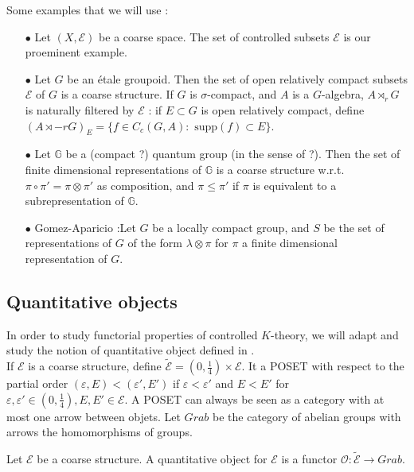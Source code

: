 \begin{Expl} Some examples that we will use :\\
\begin{itemize}
\item[$\bullet$] Let $(X,\mathcal E)$ be a coarse space. The set of controlled subsets $\mathcal E$ is our proeminent example.
\item[$\bullet$] Let $G$ be an étale groupoid. Then the set of open relatively compact subsets $\mathcal E$ of $G$ is a coarse structure. If $G$ is $\sigma$-compact, and $A$ is a $G$-algebra, $A\rtimes_r G$ is naturally filtered by $\mathcal E$ : if $E\subset G$ is open relatively compact, define $(A\rtimes-r G)_E = \{f\in C_c(G,A) : \text{ supp}(f)\subset E\}$.
\item[$\bullet$] Let $\mathbb G$ be a (compact ?) quantum group (in the sense of ?). Then the set of finite dimensional representations of $\mathbb G$ is a coarse structure w.r.t. $\pi\circ \pi'=\pi\otimes \pi'$ as composition, and $\pi\leq\pi'$ if $\pi$ is equivalent to a subrepresentation of $\mathbb G$.
\item[$\bullet$] Gomez-Aparicio :Let $G$ be a locally compact group, and $S$ be the set of representations of $G$ of the form $\lambda\otimes\pi$ for $\pi$ a finite dimensional representation of $G$.\end{itemize}   
\end{Expl}

\subsection{Quantitative objects}
In order to study functorial properties of controlled $K$-theory, we will adapt and study the notion of quantitative object defined in \cite{OY2}.\\

If $\mathcal E$ is a coarse structure, define $\mathcal{\tilde E} = (0,\frac{1}{4})\times \mathcal E$. It a POSET with respect to the partial order $(\varepsilon,E)<(\varepsilon', E')$ if $\varepsilon<\varepsilon'$ and $E<E'$ for $\varepsilon,\varepsilon'\in (0,\frac{1}{4}),E,E'\in\mathcal E$. A POSET can always be seen as a category with at most one arrow between objets. Let $Grab$ be the category of abelian groups with arrows the homomorphisms of groups.
\begin{definition}
Let $\mathcal E$ be a coarse structure. A quantitative object for $\mathcal E$ is a functor $\mathcal O :  \mathcal{\tilde E} \rightarrow Grab$.
\end{definition}


